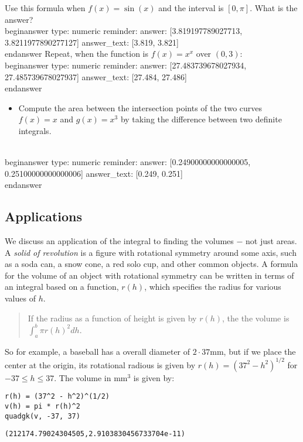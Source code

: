 \documentclass[12pt]{article}
\begin{document}
\newline
Use this formula when $f(x) = \sin(x)$ and the interval is $[0,\pi]$. What is the answer?
\\begin{answer}
    type: numeric
    reminder: 
    answer: [3.819197789027713, 3.8211977890277127]
    answer_text: [3.819, 3.821] 
\\end{answer}
\newline
Repeat, when the function is $f(x) = x^x$ over $(0, 3)$:
\\begin{answer}
    type: numeric
    reminder: 
    answer: [27.483739678027934, 27.485739678027937]
    answer_text: [27.484, 27.486] 
\\end{answer}
\begin{itemize}\item Compute the area between the intersection points of the two curves $f(x) = x$ and $g(x) = x^3$ by taking the difference between two definite integrals.\end{itemize}
\\begin{answer}
    type: numeric
    reminder: 
    answer: [0.24900000000000005, 0.25100000000000006]
    answer_text: [0.249, 0.251] 
\\end{answer}
\subsection{Applications}\newline
We discuss an application of the integral to finding the volumes $-$ not just areas.\newline
A \textit{solid of revolution} is a figure with rotational symmetry around some axis, such as a soda can, a snow cone, a red solo cup, and other common objects. A formula for the volume of an object with rotational symmetry can be written in terms of an integral based on a function, $r(h)$, which specifies the radius for various values of $h$.\begin{quotation}\newline
If the radius as a function of height is given by $r(h)$, the the volume is $\int_a^b \pi r(h)^2 dh$.\end{quotation}\newline
So for example, a baseball has a overall diameter of $2\cdot 37$mm, but if we place the center at the origin, its rotational radious is given by $r(h) = (37^2 - h^2)^{1/2}$ for $-37 \leq h \leq 37$. The volume in mm$^3$ is given by:\begin{verbatim}
r(h) = (37^2 - h^2)^(1/2)
v(h) = pi * r(h)^2
quadgk(v, -37, 37)
\end{verbatim}
\begin{verbatim}
(212174.79024304505,2.9103830456733704e-11)\end{verbatim}
\end{document}
